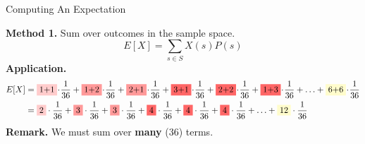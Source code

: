 \documentclass[10pt]{beamer}
\begin{document}
\begin{frame}{Computing An Expectation}
\footnotesize 
\begin{table}
\caption{\textit{Possible outcomes when rolling a pair of dice.} Each table entry gives the sum of the values on the two dice.}	
\pause 
{}
\end{table}

\vfill 
\colorbox{blue!30}{\textbf{Method 1.}} \pause \; Sum over outcomes in the sample space.
\[ E[X] = \sum_{s \in S} X(s) P(s) \]
\vfill 
\pause 
\colorbox{blue!30}{\textbf{Application.}}
\scriptsize 
\begin{align*}
 E[X] 
&=\colorbox{red!20}{1+1} \!\cdot\! \frac{1}{36} + \colorbox{red!40}{1+2}\!\cdot\!\frac{1}{36}  + \colorbox{red!40}{2+1} \!\cdot\! \frac{1}{36} +\colorbox{red!60}{3+1} \!\cdot\! \frac{1}{36}  + \colorbox{red!60}{2+2} \!\cdot\!\frac{1}{36}  + 
 \colorbox{red!60}{1+3} \!\cdot\!\frac{1}{36} + \hdots + 
  \colorbox{yellow!20}{6+6} \!\cdot\! \frac{1}{36}  \\
 &= \colorbox{red!20}{2} \cdot \frac{1}{36} + \colorbox{red!40}{3} \cdot \frac{1}{36}  + \colorbox{red!40}{3} \cdot \frac{1}{36} +\colorbox{red!60}{4} \cdot \frac{1}{36}  + \colorbox{red!60}{4} \cdot \frac{1}{36}  + 
 \colorbox{red!60}{4} \cdot \frac{1}{36} + \hdots + 
  \colorbox{yellow!20}{12} \cdot \frac{1}{36} 
\end{align*}
\footnotesize 
\vfill 
\pause 
\colorbox{blue!30}{\textbf{Remark.}} \; We must sum over \textbf{many} (36) terms.
\end{frame}
\end{document}
